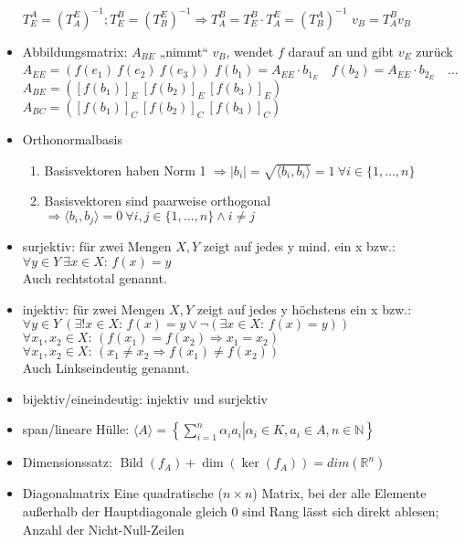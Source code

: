 \documentclass[6pt,a4paper]{scrartcl}
\newcommand{\R}{\ensuremath{\mathbb R}}
\begin{document}
\begin{multicols}{3}
\begin{itemize}
		\subitem $T_E^A = (T_A^E)^{-1}; T_E^B=(T_B^E)^{-1} \Rightarrow T_A^B = T_E^B \cdot T_A^E = \left(T_B^A\right)^{-1} $
		\subitem $v_B = T_A^B v_B$
	\item Abbildungsmatrix: $A_{BE}$ „nimmt“ $v_B$, wendet $f$ darauf an und gibt $v_E$ zurück
		\subitem $A_{EE}=\left(f(e_1) ~ f(e_2) ~ f(e_3)\right)$
		\subitem $f(b_1)=A_{EE} \cdot b_{1_E} \quad f(b_2)=A_{EE}\cdot b_{2_E} \quad …$ 
		\subitem $A_{BE}=\left([f(b_1)]_E ~ [f(b_2)]_E ~ [f(b_3)]_E\right)$
		\subitem $A_{BC}=\left([f(b_1)]_C ~ [f(b_2)]_C ~ [f(b_3)]_C\right)$
	\item Orthonormalbasis
	\begin{enumerate}
		\item Basisvektoren haben Norm 1 $\Rightarrow |b_{i}|={\sqrt {\langle b_{i},b_{i}\rangle }}=1 ~ \forall i\in\{1,…,n\}$
		\item Basisvektoren sind paarweise orthogonal $\Rightarrow \langle b_{i},b_{j}\rangle =0~\forall i,j \in \{1,…,n\} \wedge i \neq j$
	\end{enumerate}
	\item surjektiv: für zwei Mengen $X, Y$ zeigt auf jedes y mind. ein x bzw.: \\
	$\forall y\in Y\ \exists x\in X\colon \,f(x)=y$ \\
	Auch rechtstotal genannt. 
	\item injektiv: für zwei Mengen $X, Y$ zeigt auf jedes y höchstens ein x bzw.: \\
	$\forall y\in Y\ (\exists !x\in X\colon \,f(x)=y\vee \neg (\exists x\in X\colon \,f(x)=y))$ \\
	$\forall x_{1},x_{2}\in X\colon \,(f(x_{1})=f(x_{2})\Rightarrow x_{1}=x_{2})$ \\
	$\forall x_{1},x_{2}\in X\colon \,(x_{1}\neq x_{2}\Rightarrow f(x_{1})\neq f(x_{2}))$ \\
	Auch Linkseindeutig genannt.
	\item bijektiv/eineindeutig: injektiv und surjektiv
	\item span/lineare Hülle: $\langle A\rangle =\left\{\left.\textstyle \sum \limits _{{i=1}}^{n}\alpha _{i}a_{i}\right|\alpha _{i}\in K,a_{i}\in A,n\in \mathbb{N} \right\}$
	\item Dimensionssatz: $\operatorname{Bild}(f_A)+\dim(\ker(f_A))=dim(\R^n)$
	\item Diagonalmatrix
		\subitem Eine quadratische ($n \times n$) Matrix, bei der alle Elemente außerhalb der Hauptdiagonale gleich 0 sind
		\subitem Rang lässt sich direkt ablesen; Anzahl der Nicht-Null-Zeilen

\end{itemize}
\end{multicols}
\end{document}

